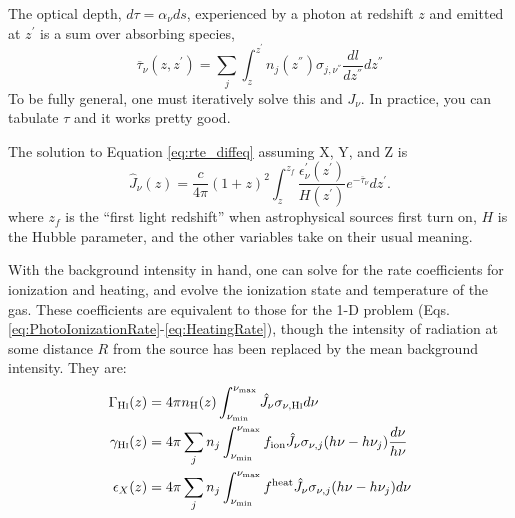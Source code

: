 The optical depth, $d\tau = \alpha_{\nu} ds$, experienced by a photon at redshift $z$ and emitted at $z^{\prime}$ is a sum over absorbing species,
\begin{equation}
    \overline{\tau}_{\nu}(z, z^{\prime}) = \sum_j \int_{z}^{z^{\prime}} n_j(z^{\dprime}) \sigma_{j, \nu^{\dprime}} \frac{dl}{dz^{\dprime}}dz^{\dprime} \label{eq:tau_igm}
\end{equation}
To be fully general, one must iteratively solve this and $J_{\nu}$. In practice, you can tabulate $\tau$ and it works pretty good.


The solution to Equation \ref{eq:rte_diffeq} {\color{red} assuming X, Y, and Z} is
\begin{equation}
    \hat{J}_{\nu} (z) = \frac{c}{4\pi} (1 + z)^2 \int_{z}^{z_f} \frac{\epsilon_{\nu}^{\prime}(z^{\prime})}{H(z^{\prime})} e^{-\overline{\tau}_{\nu}} dz^{\prime} . \label{eq:AngleAveragedFlux}
\end{equation}    
where $z_f$ is the ``first light redshift'' when astrophysical sources first turn on, $H$ is the Hubble parameter, and the other variables take on their usual meaning. 



With the background intensity in hand, one can solve for the rate coefficients for ionization and heating, and evolve the ionization state and temperature of the gas.  These coefficients are equivalent to those for the 1-D problem (Eqs. \ref{eq:PhotoIonizationRate}-\ref{eq:HeatingRate}), though the intensity of radiation at some distance $R$ from the source has been replaced by the mean background intensity. They are:
\begin{align}
    \Gamma_{\text{H} {\textsc{i}}}(z) & = 4 \pi n_{\text{H}}(z) \int_{\nu_{\min}}^{\nu_{\max}} \hat{J}_{\nu} \sigma_{\nu,\text{H} {\textsc{i}}} d\nu  \\
    \gamma_{\text{H} {\textsc{i}}}(z) & = 4 \pi \sum_j n_j \int_{\nu_{\min}}^{\nu_{\max}} f_{\text{ion}} \hat{J}_{\nu} \sigma_{\nu,j} (h\nu - h\nu_j) \frac{d\nu}{h\nu}  \\
    \epsilon_X(z) & = 4 \pi \sum_j n_j \int_{\nu_{\min}}^{\nu_{\max}} f^{\text{heat}} \hat{J}_{\nu}  \sigma_{\nu,j} (h\nu - h\nu_j) d\nu
\end{align}


